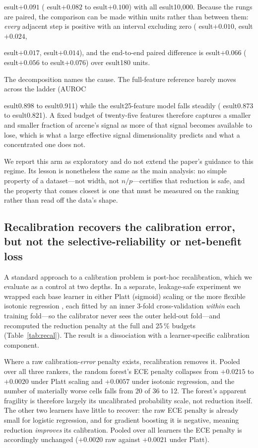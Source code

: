 \documentclass[fleqn,10pt]{wlscirep}
\newcommand{\result}[1]{#1}
\begin{document}
esult{$+0.091$} (
esult{$+0.082$} to 
esult{$+0.100$}) with all 
esult{10{,}000}. Because the
rungs are paired, the comparison can be made within units rather than between them: \emph{every}
adjacent step is positive with an interval excluding zero (
esult{$+0.010$}, 
esult{$+0.024$},

esult{$+0.017$}, 
esult{$+0.014$}), and the end-to-end paired difference is 
esult{$+0.066$}
(
esult{$+0.056$} to 
esult{$+0.076$}) over 
esult{180} units.

The decomposition names the cause. The full-feature reference barely moves across the ladder (AUROC

esult{0.898} to 
esult{0.911}) while the 
esult{25}-feature model falls steadily
(
esult{0.873} to 
esult{0.821}). A fixed budget of twenty-five features therefore captures a
smaller and smaller fraction of arcene's signal as more of that signal becomes available to lose,
which is what a large effective signal dimensionality predicts and what a concentrated one does not.


We report this arm as exploratory and do not extend the paper's guidance to this regime. Its lesson
is nonetheless the same as the main analysis: no simple property of a dataset---not width, not
$n/p$---certifies that reduction is safe, and the property that comes closest is one that must
be measured on the ranking rather than read off the data's shape.

\subsection{Recalibration recovers the calibration error, but not the selective-reliability or
net-benefit loss}
\label{sec:recal}
A standard approach to a calibration problem is post-hoc recalibration, which we evaluate as a control
at two depths. In a separate, leakage-safe experiment we wrapped each base learner in either Platt
(sigmoid) scaling or the more flexible isotonic regression \cite{niculescu2005predicting}, each fitted by an inner 3-fold
cross-validation \emph{within} each training fold---so the calibrator never sees the outer held-out
fold---and recomputed the reduction penalty at the full and 25\,\% budgets (Table~\ref{tab:recal}). The
result is a dissociation with a learner-specific calibration component.

Where a raw calibration-\emph{error} penalty exists, recalibration removes it. Pooled over all three
rankers, the random forest's ECE penalty collapses from \result{$+0.0215$} to \result{$+0.0020$}
under Platt scaling and \result{$+0.0057$} under isotonic regression, and the number of materially
worse cells falls from \result{20} of \result{36} to \result{12}. The forest's apparent fragility is
therefore largely its uncalibrated probability scale, not reduction itself. The other two learners
have little to recover: the raw ECE penalty is already small for logistic regression, and for
gradient boosting it is negative, meaning reduction \emph{improves} its calibration. Pooled over all
learners the ECE penalty is accordingly unchanged (\result{$+0.0020$} raw against \result{$+0.0021$}
under Platt).
\end{document}

